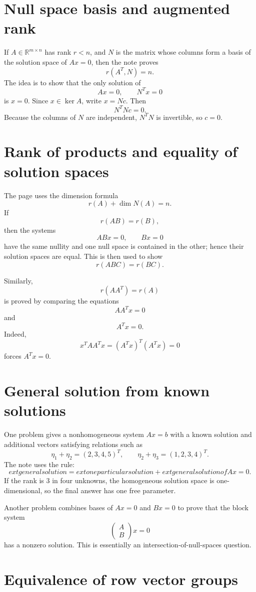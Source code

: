 \section{Null space basis and augmented rank}

If $A\in\mathbb R^{m\times n}$ has rank $r<n$, and $N$ is the matrix whose columns form a basis of the solution space of $Ax=0$, then the note proves
\[
  r(A^T,N)=n.
\]
The idea is to show that the only solution of
\[
  A x=0,\qquad N^Tx=0
\]
is $x=0$.  Since $x\in\ker A$, write $x=Nc$.  Then
\[
  N^TNc=0.
\]
Because the columns of $N$ are independent, $N^TN$ is invertible, so $c=0$.

\section{Rank of products and equality of solution spaces}

The page uses the dimension formula
\[
  r(A)+\dim N(A)=n.
\]
If
\[
  r(AB)=r(B),
\]
then the systems
\[
  ABx=0,\qquad Bx=0
\]
have the same nullity and one null space is contained in the other; hence their solution spaces are equal.  This is then used to show
\[
  r(ABC)=r(BC).
\]

Similarly,
\[
  r(AA^T)=r(A)
\]
is proved by comparing the equations
\[
  AA^Tx=0
\]
and
\[
  A^Tx=0.
\]
Indeed,
\[
  x^TAA^Tx=(A^Tx)^T(A^Tx)=0
\]
forces $A^Tx=0$.

\section{General solution from known solutions}

One problem gives a nonhomogeneous system $Ax=b$ with a known solution and additional vectors satisfying relations such as
\[
  \eta_1+\eta_2=(2,3,4,5)^T,\qquad
  \eta_2+\eta_3=(1,2,3,4)^T.
\]
The note uses the rule:
\[
  	ext{general solution}
  =
  	ext{one particular solution}
  +
  	ext{general solution of }Ax=0.
\]
If the rank is $3$ in four unknowns, the homogeneous solution space is one-dimensional, so the final answer has one free parameter.

Another problem combines bases of $Ax=0$ and $Bx=0$ to prove that the block system
\[
  \begin{pmatrix}A\\B\end{pmatrix}x=0
\]
has a nonzero solution.  This is essentially an intersection-of-null-spaces question.

\section{Equivalence of row vector groups}

